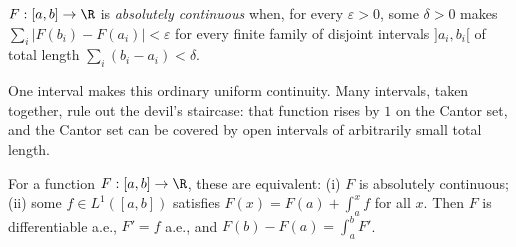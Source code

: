 \begin{definition}
$F:[a,b]\to\R$ is \emph{absolutely continuous} when, for every $\varepsilon>0$, some $\delta>0$ makes $\sum_i|F(b_i)-F(a_i)|<\varepsilon$ for every finite family of disjoint intervals $]a_i,b_i[$ of total length
$\sum_i(b_i-a_i)<\delta$.
\end{definition}

One interval makes this ordinary uniform continuity. Many intervals, taken together, rule out the devil's staircase: that function rises by $1$ on the Cantor set, and the Cantor set can be covered by open intervals of arbitrarily small total length.

\begin{theorem}\label{thm:ftc}
For a function $F:[a,b]\to\R$, these are equivalent: (i) $F$ is absolutely continuous; (ii) some $f\in L^1([a,b])$ satisfies $F(x)=F(a)+\int_a^xf$ for all $x$. Then $F$ is differentiable a.e., $F'=f$ a.e., and
$F(b)-F(a)=\int_a^bF'$.
\end{theorem}
